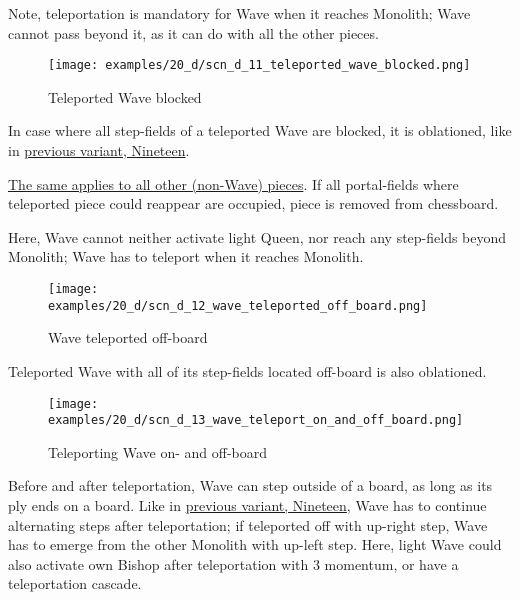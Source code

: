 Note, teleportation is mandatory for Wave when it reaches Monolith; Wave cannot
pass beyond it, as it can do with all the other pieces.

\clearpage %

\vspace*{-3.2\baselineskip}
\noindent
\begin{figure}[!h]
\texttt{[image: examples/20\_d/scn\_d\_11\_teleported\_wave\_blocked.png]}
\caption{Teleported Wave blocked}
\label{fig:scn_d_11_teleported_wave_blocked}
\end{figure}

In case where all step-fields of a teleported Wave are blocked, it is oblationed, like in
\hyperref[fig:scn_n_06_teleport_wave_blocked]{previous variant, Nineteen}.

\hyperref[fig:scn_n_03_teleport_move_2]{The same applies to all other (non-Wave) pieces}.
If all portal-fields where teleported piece could reappear are occupied, piece is removed
from chessboard.

Here, Wave cannot neither activate light Queen, nor reach any step-fields beyond Monolith;
Wave has to teleport when it reaches Monolith.

\clearpage %

\vspace*{-3.2\baselineskip}
\noindent
\begin{figure}[!h]
\texttt{[image: examples/20\_d/scn\_d\_12\_wave\_teleported\_off\_board.png]}
\caption{Wave teleported off-board}
\label{fig:scn_d_12_wave_teleported_off_board}
\end{figure}

Teleported Wave with all of its step-fields located off-board is also oblationed.

\clearpage %

\noindent
\begin{figure}[!h]
\texttt{[image: examples/20\_d/scn\_d\_13\_wave\_teleport\_on\_and\_off\_board.png]}
\caption{Teleporting Wave on- and off-board}
\label{fig:scn_d_13_wave_teleport_on_and_off_board}
\end{figure}

Before and after teleportation, Wave can step outside of a board, as long as its ply ends
on a board. Like in \hyperref[fig:scn_n_08_teleport_wave_end]{previous variant, Nineteen},
Wave has to continue alternating steps after teleportation; if teleported off with up-right
step, Wave has to emerge from the other Monolith with up-left step. Here, light Wave could
also activate own Bishop after teleportation with 3 momentum, or have a teleportation cascade.

